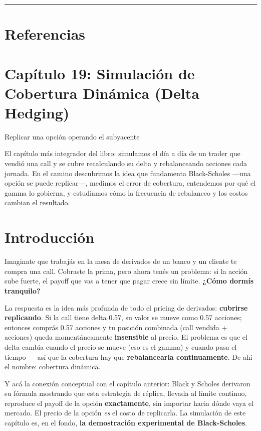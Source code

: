 \documentclass[
  spanish,
  letterpaper,
  DIV=11,
  numbers=noendperiod]{scrreprt}
\begin{document}
\begin{center}\rule{0.5\linewidth}{0.5pt}\end{center}

\chapter{Referencias}\label{referencias-17}

\label{refs}

\chapter{Capítulo 19: Simulación de Cobertura Dinámica (Delta
Hedging)}\label{capuxedtulo-19-simulaciuxf3n-de-cobertura-dinuxe1mica-delta-hedging}

Replicar una opción operando el subyacente

El capítulo más integrador del libro: simulamos el día a día de un
trader que vendió una call y se cubre recalculando su delta y
rebalanceando acciones cada jornada. En el camino descubrimos la idea
que fundamenta Black-Scholes ---una opción se puede replicar---, medimos
el error de cobertura, entendemos por qué el gamma lo gobierna, y
estudiamos cómo la frecuencia de rebalanceo y los costos cambian el
resultado.

\hfill\break

\chapter{Introducción}\label{introducciuxf3n-16}

Imaginate que trabajás en la mesa de derivados de un banco y un cliente
te compra una call. Cobraste la prima, pero ahora tenés un problema: si
la acción sube fuerte, el payoff que vas a tener que pagar crece sin
límite. \textbf{¿Cómo dormís tranquilo?}

La respuesta es la idea más profunda de todo el pricing de derivados:
\textbf{cubrirse replicando}. Si la call tiene delta 0.57, su valor se
mueve como 0.57 acciones; entonces comprás 0.57 acciones y tu posición
combinada (call vendida + acciones) queda momentáneamente
\textbf{insensible} al precio. El problema es que el delta cambia cuando
el precio se mueve (eso es el gamma) y cuando pasa el tiempo --- así que
la cobertura hay que \textbf{rebalancearla continuamente}. De ahí el
nombre: cobertura dinámica.

Y acá la conexión conceptual con el capítulo anterior: Black y Scholes
derivaron su fórmula mostrando que esta estrategia de réplica, llevada
al límite continuo, reproduce el payoff de la opción
\textbf{exactamente}, sin importar hacia dónde vaya el mercado. El
precio de la opción \emph{es} el costo de replicarla. La simulación de
este capítulo es, en el fondo, \textbf{la demostración experimental de
Black-Scholes}.
\end{document}
